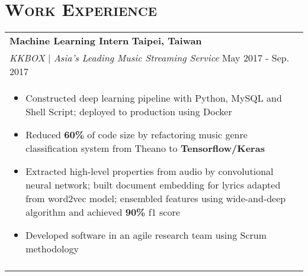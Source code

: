 \documentclass[letterpaper,11pt]{article} %
\begin{document}
{\section{\Large\bf\textsc{Work Experience}}
\begin{tabular}{p{18.5cm}}


{\bf{Machine Learning Intern}} \hfill \bf{Taipei, Taiwan}\\
{\it KKBOX} | {\it Asia's Leading Music Streaming Service } \hfill  May 2017 - Sep. 2017\\%
\begin{itemize}
\vspace{-3mm}
\item Constructed deep learning pipeline with Python, MySQL and Shell Script; deployed to production using Docker
\item Reduced {\bf 60\%} of code size by refactoring music genre classification system from Theano to {\bf Tensorflow/Keras} 
\item Extracted high-level properties from audio by convolutional neural network; built document embedding for lyrics adapted from word2vec model; ensembled features using wide-and-deep algorithm and achieved {\bf 90\%} f1 score 
\item Developed software in an agile research team using Scrum methodology \vspace*{-\baselineskip}
\end{itemize} \\ 
\vspace{.1mm}


\end{tabular}}
\end{document}
